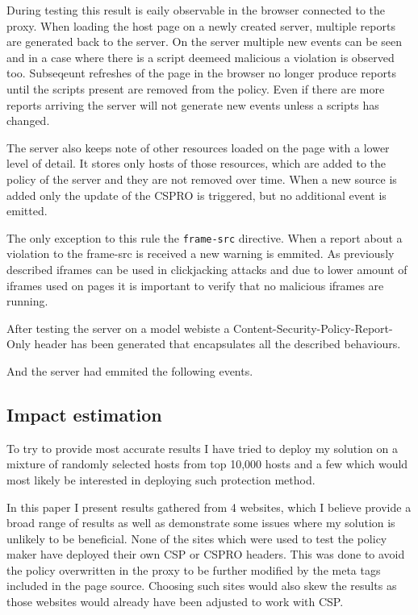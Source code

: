 \begin{description}
During testing this result is eaily observable in the browser connected to the proxy.
When loading the host page on a newly created server, multiple reports are generated back to the server.
On the server multiple new events can be seen and in a case where there is a script deemeed malicious a violation is observed too.
Subseqeunt refreshes of the page in the browser no longer produce reports until the scripts present are removed from the policy.
Even if there are more reports arriving the server will not generate new events unless a scripts has changed.

The server also keeps note of other resources loaded on the page with a lower level of detail.
It stores only hosts of those resources, which are added to the policy of the server and they are not removed over time.
When a new source is added only the update of the CSPRO is triggered, but no additional event is emitted.

The only exception to this rule the \texttt{frame-src} directive. 
When a report about a violation to the frame-src is received a new warning is emmited.
As previously described iframes can be used in clickjacking attacks and due to lower amount of iframes used on pages it is important to verify that no malicious iframes are running.

After testing the server on a model webiste a Content-Security-Policy-Report-Only header has been generated that encapsulates all the described behaviours.


And the server had emmited the following events.


\subsection{Impact estimation}

To try to provide most accurate results I have tried to deploy my solution on a mixture of randomly selected hosts from top 10,000 hosts and a few which would most likely be interested in deploying such protection method.

In this paper I present results gathered from 4 websites, which I believe provide a broad range of results as well as demonstrate some issues where my solution is unlikely to be beneficial.
None of the sites which were used to test the policy maker have deployed their own CSP or CSPRO headers.
This was done to avoid the policy overwritten in the proxy to be further modified by the meta tags included in the page source.
Choosing such sites would also skew the results as those websites would already have been adjusted to work with CSP.


\end{description}
